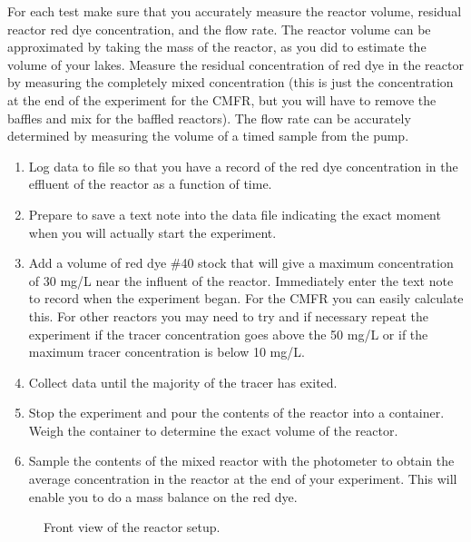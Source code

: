 \documentclass[letterpaper,10pt,english]{sphinxmanual}
\let\sphinxpxdimen\pdfpxdimen\else\newdimen\sphinxpxdimen
\begin{document}
For each test make sure that you accurately measure the reactor volume, residual reactor red dye concentration, and the flow rate. The reactor volume can be approximated by taking the mass of the reactor, as you did to estimate the volume of your lakes.  Measure the residual concentration of red dye in the reactor by measuring the completely mixed concentration (this is just the concentration at the end of the experiment for the CMFR, but you will have to remove the baffles and mix for the baffled reactors). The flow rate can be accurately determined by measuring the volume of a timed sample from the pump.
\begin{enumerate}
\item {} 
Log data to file so that you have a record of the red dye concentration in the effluent of the reactor as a function of time.

\item {} 
Prepare to save a text note into the data file indicating the exact moment when you will actually start the experiment.

\item {} 
Add a volume of red dye \#40 stock that will give a maximum concentration of  30 mg/L near the influent of the reactor. Immediately enter the text note to record when the experiment began. For the CMFR you can easily calculate this. For other reactors you may need to try and if necessary repeat the experiment if the tracer concentration goes above the 50 mg/L or if the maximum tracer concentration is below 10 mg/L.

\item {} 
Collect data until the majority of the tracer has exited.

\item {} 
Stop the experiment and pour the contents of the reactor into a container. Weigh the container to determine the exact volume of the reactor.

\item {} 
Sample the contents of the mixed reactor with the photometer to obtain the average concentration in the reactor at the end of your experiment. This will enable you to do a mass balance on the red dye.

\end{enumerate}

\begin{figure}[htbp]
\centering
\capstart

\noindent\sphinxincludegraphics[width=300\sphinxpxdimen]{{Reactor_photo_front}.png}
\caption{Front view of the reactor setup.}\label{\detokenize{Reactor_Characteristics/Reactor_Characteristics:id9}}\label{\detokenize{Reactor_Characteristics/Reactor_Characteristics:figure-reactor-photo-front}}\end{figure}
\end{document}
